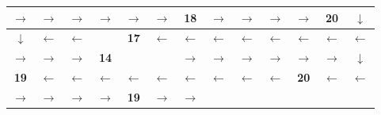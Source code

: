 \begin{center}
\begin{minipage}{\textwidth}
\renewcommand{\arraystretch}{1.4}
\begin{table}[H]
\centering 
\begin{scriptsize}
\begin{tabular}{|>{}c|>{}c|>{}c|>{}c|>{}c|>{}c|>{}c|>{}c|>{}c|>{}c|>{}c|>{}c|>{}c|}
\hline
\cellcolor{red!15!white}$\rightarrow$&\cellcolor{red!15!white}$\rightarrow$&\cellcolor{red!15!white}$\rightarrow$&\cellcolor{red!15!white}$\rightarrow$&\cellcolor{red!15!white}$\rightarrow$&\cellcolor{red!15!white}$\rightarrow$&\cellcolor{red!15!white}\bf{18}&\cellcolor{green!15!white}
$\rightarrow$&\cellcolor{green!15!white}$\rightarrow$&\cellcolor{green!15!white}$\rightarrow$&\cellcolor{green!15!white}$\rightarrow$&\cellcolor{green!15!white}\bf{20}&\cellcolor{yellow!15!white}$\downarrow$\\
\hline
\cellcolor{green!15!white}$\downarrow$&\cellcolor{green!15!white}$\leftarrow$&\cellcolor{green!15!white}$\leftarrow$&\cellcolor{gray!50!white} &\cellcolor{yellow!15!white}\bf{17}&
\cellcolor{yellow!15!white}$\leftarrow$&\cellcolor{yellow!15!white}$\leftarrow$&\cellcolor{yellow!15!white}$\leftarrow$&\cellcolor{yellow!15!white}$\leftarrow$&\cellcolor{yellow!15!white}$\leftarrow$&\cellcolor{yellow!15!white}$\leftarrow$&\cellcolor{yellow!15!white}$\leftarrow$&\cellcolor{yellow!15!white}$\leftarrow$ \\
\hline
\cellcolor{green!15!white}$\rightarrow$&\cellcolor{green!15!white}$\rightarrow$&\cellcolor{green!15!white}$\rightarrow$&\cellcolor{green!15!white}\bf{14}&\cellcolor{gray!50!white} &\cellcolor{gray!50!white} &\cellcolor{blue!15!white}$\rightarrow$&\cellcolor{blue!15!white}$\rightarrow$&\cellcolor{blue!15!white}$\rightarrow$&\cellcolor{blue!15!white}$\rightarrow$&\cellcolor{blue!15!white}$\rightarrow$&\cellcolor{blue!15!white}$\rightarrow$&\cellcolor{blue!15!white}$\downarrow$ \\
\hline
\cellcolor{red!15!white}\bf{19}&\cellcolor{red!15!white}$\leftarrow$&\cellcolor{red!15!white}$\leftarrow$&\cellcolor{red!15!white}$\leftarrow$&\cellcolor{red!15!white}$\leftarrow$&\cellcolor{red!15!white}$\leftarrow$&\cellcolor{red!15!white}$\leftarrow$&\cellcolor{red!15!white}$\leftarrow$
&\cellcolor{red!15!white}$\leftarrow$&\cellcolor{red!15!white}$\leftarrow$&\cellcolor{blue!15!white}\bf{20}&\cellcolor{blue!15!white}$\leftarrow$&\cellcolor{blue!15!white}$\leftarrow$ \\
\hline
\cellcolor{yellow!15!white}$\rightarrow$&\cellcolor{yellow!15!white}$\rightarrow$&\cellcolor{yellow!15!white}$\rightarrow$&\cellcolor{yellow!15!white}$\rightarrow$&\cellcolor{yellow!15!white}\bf{19}&\cellcolor{green!15!white}$\rightarrow$&\cellcolor{green!15!white}$\rightarrow$

\end{tabular}
\end{scriptsize}
\end{table}
\end{minipage}
\end{center}
